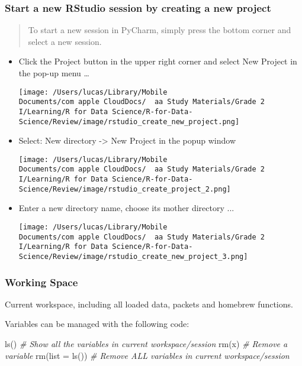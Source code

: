 \documentclass[
]{article}
\newenvironment{Shaded}{}{}
\newcommand{\AttributeTok}[1]{\textcolor[rgb]{0.49,0.56,0.16}{#1}}
\newcommand{\CommentTok}[1]{\textcolor[rgb]{0.38,0.63,0.69}{\textit{#1}}}
\newcommand{\FunctionTok}[1]{\textcolor[rgb]{0.02,0.16,0.49}{#1}}
\newcommand{\NormalTok}[1]{#1}
\begin{document}
\hypertarget{start-a-new-rstudio-session-by-creating-a-new-project}{%
\subsubsection{Start a new RStudio session by creating a new
project}\label{start-a-new-rstudio-session-by-creating-a-new-project}}

\begin{quote}
To start a new session in PyCharm, simply press the bottom corner and
select a new session.
\end{quote}

\begin{itemize}
\item
  Click the Project button in the upper right corner and select New
  Project in the pop-up menu \ldots{}

  \texttt{[image: /Users/lucas/Library/Mobile Documents/com~apple~CloudDocs/~~aa Study Materials/Grade 2 I/Learning/R for Data Science/R-for-Data-Science/Review/image/rstudio\_create\_new\_project.png]}
\item
  Select: New directory -\textgreater{} New Project in the popup window

  \texttt{[image: /Users/lucas/Library/Mobile Documents/com~apple~CloudDocs/~~aa Study Materials/Grade 2 I/Learning/R for Data Science/R-for-Data-Science/Review/image/rstudio\_create\_project\_2.png]}
\item
  Enter a new directory name, choose its mother directory ...

  \texttt{[image: /Users/lucas/Library/Mobile Documents/com~apple~CloudDocs/~~aa Study Materials/Grade 2 I/Learning/R for Data Science/R-for-Data-Science/Review/image/rstudio\_create\_new\_project\_3.png]}
\end{itemize}

\hypertarget{working-space}{%
\subsubsection{Working Space}\label{working-space}}

Current workspace, including all loaded data, packets and homebrew
functions.

Variables can be managed with the following code:

\begin{Shaded}
\begin{Highlighting}[]
\FunctionTok{ls}\NormalTok{() }\CommentTok{\# Show all the variables in current workspace/session}
\FunctionTok{rm}\NormalTok{(x) }\CommentTok{\# Remove a variable}
\FunctionTok{rm}\NormalTok{(}\AttributeTok{list =} \FunctionTok{ls}\NormalTok{()) }\CommentTok{\# Remove ALL variables in current workspace/session}
\end{Highlighting}
\end{Shaded}
\end{document}
